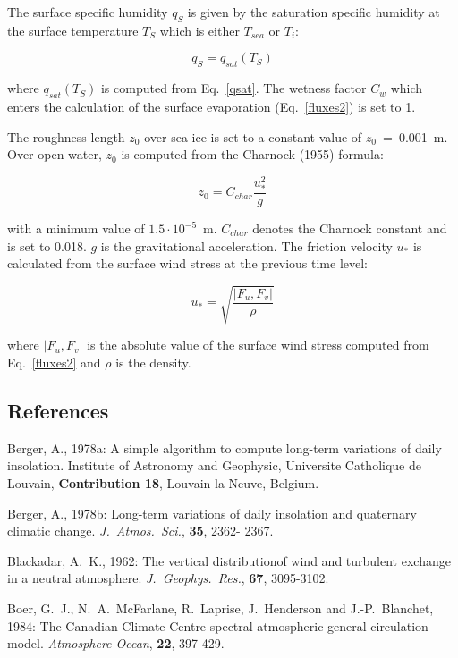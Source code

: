 The surface
specific humidity $q_S$ is given by the
saturation specific humidity at the surface
temperature $T_S$ which is either $T_{sea}$ or
$T_{i}$:

\begin{equation}
q_S =q_{sat}(T_S)
\end{equation}

where $q_{sat}(T_S)$ is computed from
Eq.~\ref{qsat}.  The wetness factor $C_w$ which
enters
the calculation of the surface evaporation
(Eq.~\ref{fluxes2}) is set to 1. 
 
The roughness length $z_0$  over sea ice is set to a
constant value of  $z_0$~=~0.001~m. Over open
water,
$z_0$ is computed from the Charnock (1955) formula:

\begin{equation}
z_0 = C_{char} \frac{u_{*}^{2}}{g}
\end{equation}

with a minimum value of $1.5 \cdot 10^{-5}$~m. 
$C_{char}$ denotes the Charnock constant and  is set
to
0.018. $g$ is the gravitational acceleration. The
friction
velocity $u_{*}$ is calculated from the surface wind
stress at the previous time level:

\begin{equation}
u_{*}=\sqrt{\frac{|F_u, F_v|}{\rho} }
\end{equation}

where $|F_u, F_v| $ is the absolute value of the surface
wind stress computed from Eq.~\ref{fluxes2} and
$\rho$
is the density.
 
\newpage

\subsection{References}

Berger, A., 1978a: A simple algorithm to compute
long-term
variations of daily insolation. Institute of Astronomy
and
Geophysic, Universite Catholique de Louvain, {\bf
Contribution
18}, Louvain-la-Neuve, Belgium.

Berger, A., 1978b: Long-term variations of daily
insolation
and quaternary climatic change. {\it J.~Atmos.~Sci.},
{\bf 35}, 2362-
2367.

Blackadar, A.~K., 1962: The vertical distributionof
wind and turbulent exchange in a neutral
atmosphere. {\it J.~Geophys.~Res.}, {\bf 67},
3095-3102.

Boer, G.~J., N.~A.~McFarlane, R.~Laprise,
J.~Henderson and J.-P.~Blanchet, 1984: The
Canadian Climate Centre spectral atmospheric general
circulation model. {\it
Atmosphere-Ocean},
{\bf 22}, 397-429.


